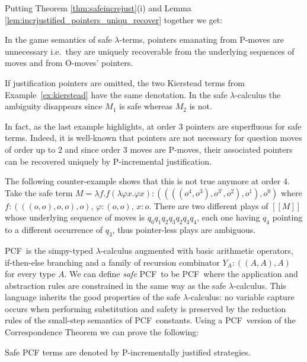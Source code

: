 \documentclass{llncs}
\newcommand{\sem}[1]{{[\![ #1 ]\!]}}
\newcommand\pcf{\textsf{PCF}}
\begin{document}
Putting Theorem \ref{thm:safeincrejust}(i)
and Lemma \ref{lem:incrjustified_pointers_uniqu_recover} together
we get:
\begin{proposition}
  \label{prop:safe_ptr_recoverable} In the game semantics of safe
  $\lambda$-terms, pointers emanating from P-moves are unnecessary
  i.e.\ they are uniquely recoverable from the underlying sequences of
  moves and from O-moves' pointers.
\end{proposition}

\begin{example} If justification pointers are omitted, the two
  Kierstead terms from Example~\ref{ex:kierstead} have the same
  denotation. In the safe $\lambda$-calculus the ambiguity disappears
  since $M_1$ is safe whereas $M_2$ is not.
\end{example}

In fact, as the last example highlights, at order $3$ pointers are
superfluous for safe terms. Indeed, it is well-known that pointers are
not necessary for question moves of order up to $2$ and since order
$3$ moves are P-moves, their associated pointers can be recovered
uniquely by P-incremental justification.

The following counter-example shows that this is not true anymore at
order $4$. Take the safe term $M = \lambda f . f (\lambda \varphi x
. \varphi x) : ((((o^4,o^3),o^{3'},o^2),o^1),o^0)$ where
$f:(((o,o),o,o),o)$, $\varphi:(o,o)$, $x:o$. There are two different
plays of $\sem{M}$ whose underlying sequence of moves is $q_0 q_1 q_2
q_3 q_2 q_3 q_4$, each one having $q_4$ pointing to a different
occurrence of $q_3$, thus pointer-less plays are ambiguous.


\pcf\ is the simpy-typed $\lambda$-calculus augmented with basic
arithmetic operators, if-then-else branching and a family of recursion
combinator $Y_A : ((A,A),A)$ for every type $A$.  We can define
\emph{safe} \pcf\ to be \pcf\ where the application and abstraction
rules are constrained in the same way as the safe $\lambda$-calculus.
This language inherits the good properties of the safe
$\lambda$-calculus: no variable capture occurs when performing
substitution and safety is preserved by the reduction rules of the
small-step semantics of \pcf\ constants. Using a \pcf\ version of the
Correspondence Theorem we can prove the following:
\begin{theorem}
\label{thm:safepcfpincr}
Safe PCF terms are denoted by P-incrementally justified strategies.
\end{theorem}
\end{document}
